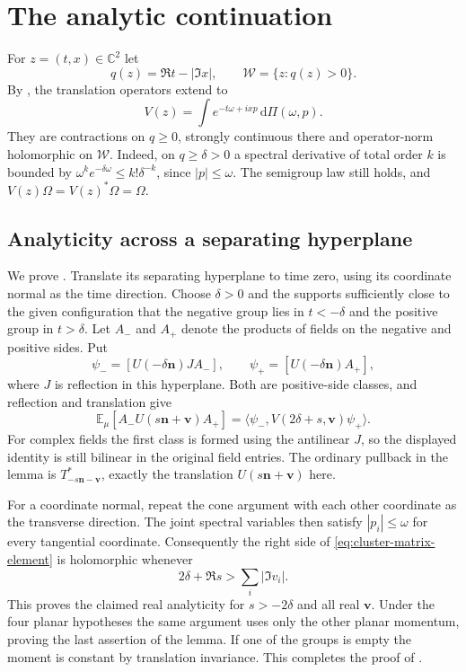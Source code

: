 \documentclass[11pt, letterpaper, reqno]{amsart}
\theoremstyle{definition}
\theoremstyle{remark}
\newcommand{\bbC}{\mathbb{C}}
\newcommand{\bbE}{\mathbb{E}}
\newcommand{\calW}{\mathcal{W}}
\newcommand{\bfn}{\mathbf{n}}
\newcommand{\bfv}{\mathbf{v}}
\newcommand{\dd}{\,\mathrm{d}}
\begin{document}
\section{The analytic continuation}\label{sec:analytic}

For $z=(t,x)\in\bbC^2$ let
\begin{equation}\label{eq:tube}
 q(z)=\Re t-|\Im x|,\qquad\calW=\{z:q(z)>0\}.
\end{equation}
By , the translation operators extend to
\begin{equation}\label{eq:complex-translations}
 V(z)=\int e^{-t\omega+ixp}\dd\Pi(\omega,p).
\end{equation}
They are contractions on $q\geq0$, strongly continuous there and
operator-norm holomorphic on $\calW$. Indeed, on $q\geq\delta>0$ a
spectral derivative of total order $k$ is bounded by
$\omega^ke^{-\delta\omega}\leq k!\delta^{-k}$, since $|p|\leq\omega$.
The semigroup law still holds, and $V(z)\Omega=V(z)^*\Omega=\Omega$.

\subsection{Analyticity across a separating hyperplane}
\label{subsec:cluster-analyticity}

We prove . Translate its separating hyperplane
to time zero, using its coordinate normal as the time direction.
Choose $\delta>0$ and the supports sufficiently close to the given
configuration that the negative group lies in $t<-\delta$ and the
positive group in $t>\delta$. Let $A_-$ and
$A_+$ denote the products of fields on the negative and positive
sides. Put
\begin{equation}
 \psi_-=[U(-\delta\bfn)J A_-],\qquad
 \psi_+=[U(-\delta\bfn)A_+],
\end{equation}
where $J$ is reflection in this hyperplane. Both are positive-side
classes, and reflection and translation give
\begin{equation}\label{eq:cluster-matrix-element}
 \bbE_\mu[A_-U(s\bfn+\bfv)A_+]
   =\langle\psi_-,V(2\delta+s,\bfv)\psi_+\rangle.
\end{equation}
For complex fields the first class is formed using the antilinear
$J$, so the displayed identity is still bilinear in the original
field entries. The ordinary pullback in the lemma is
$T_{-s\bfn-\bfv}^*$, exactly the translation $U(s\bfn+\bfv)$ here.

For a coordinate normal, repeat the cone argument with each other
coordinate as the transverse direction. The joint spectral variables
then satisfy $|p_i|\leq\omega$ for every tangential coordinate.
Consequently the right side of \eqref{eq:cluster-matrix-element} is
holomorphic whenever
\begin{equation}
 2\delta+\Re s>\sum_i|\Im v_i|.
\end{equation}
This proves the claimed real analyticity for $s>-2\delta$ and all
real $\bfv$. Under the four planar hypotheses the same argument uses
only the other planar momentum, proving the last assertion of the
lemma. If one of the groups is empty the moment is constant by
translation invariance. This completes the proof of
.
\end{document}
